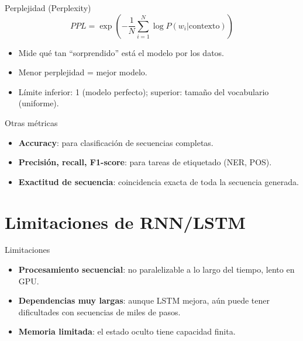 \documentclass[aspectratio=169, 10pt, xcolor=table]{beamer}
\begin{document}
\begin{frame}{Perplejidad (Perplexity)}
    \[
    PPL = \exp\left(-\frac{1}{N}\sum_{i=1}^{N} \log P(w_i | \text{contexto})\right)
    \]
    \begin{itemize}
        \item Mide qué tan ``sorprendido'' está el modelo por los datos.
        \item Menor perplejidad = mejor modelo.
        \item Límite inferior: 1 (modelo perfecto); superior: tamaño del vocabulario (uniforme).
    \end{itemize}
\end{frame}

\begin{frame}{Otras métricas}
    \begin{itemize}
        \item \textbf{Accuracy}: para clasificación de secuencias completas.
        \item \textbf{Precisión, recall, F1-score}: para tareas de etiquetado (NER, POS).
        \item \textbf{Exactitud de secuencia}: coincidencia exacta de toda la secuencia generada.
    \end{itemize}
\end{frame}

\section{Limitaciones de RNN/LSTM}

\begin{frame}{Limitaciones}
    \begin{itemize}
        \item \textbf{Procesamiento secuencial}: no paralelizable a lo largo del tiempo, lento en GPU.
        \item \textbf{Dependencias muy largas}: aunque LSTM mejora, aún puede tener dificultades con secuencias de miles de pasos.
        \item \textbf{Memoria limitada}: el estado oculto tiene capacidad finita.
    \end{itemize}
\end{frame}

\end{document}
